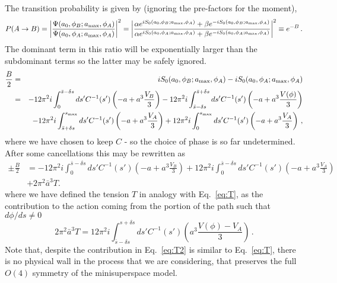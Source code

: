 \documentclass[a4paper,11pt]{article}
\numberwithin{equation}{section}
\begin{document}
The transition probability is given by (ignoring the pre-factors for
the moment),
\begin{equation}
P(A\rightarrow B)=\bigg|\frac{\Psi(a_{0},\phi_{B};a_{{\rm max}},\phi_{A})}{\Psi(a_{0},\phi_{A};a_{{\rm max}},\phi_{A})}\bigg|^{2}=\bigg|\frac{\alpha e^{iS_{0}(a_{0},\phi_{B};a_{{\rm max}},\phi_{A})}+\beta e^{-iS_{0}(a_{0},\phi_{B};a_{{\rm max}},\phi_{A})}}{\alpha e^{iS_{0}(a_{0},\phi_{A};a_{{\rm max}},\phi_{A})}+\beta e^{-iS_{0}(a_{0},\phi_{A};a_{{\rm max}},\phi_{A})}}\bigg|^{2}\equiv e^{-B}\label{eq:PAB} \,.
\end{equation}
The dominant term in this ratio will be exponentially larger than
the subdominant terms so the latter may be safely ignored.
\begin{eqnarray}
\frac{B}{2} & = & iS_{0}(a_{0},\phi_{B};a_{{\rm max}},\phi_{A})-iS_{0}(a_{0},\phi_{A};a_{{\rm max}},\phi_{A}) \label{eq:B1} \\
 & = & -12\pi^{2}i\int_{0}^{\bar{s}-\delta s}ds'C^{-1}(s')\left(-a+a^{3}\frac{V_{B}}{3}\right)-12\pi^{2}i\int_{\bar{s}-\delta s}^{\bar{s}+\delta s}ds'C^{-1}(s')\left(-a+a^{3}\frac{V(\phi)}{3}\right)\nonumber \\
 &  & -12\pi^{2}i\int_{\bar{s}+\delta s}^{s_{{\rm max}}}ds'C^{-1}(s')\left(-a+a^{3}\frac{V_{A}}{3}\right)+12\pi^{2}i\int_{0}^{s_{{\rm max}}}ds'C^{-1}(s')\left(-a+a^{3}\frac{V_{A}}{3}\right) \,, \nonumber
\end{eqnarray}
where we have chosen to keep $C$ - so the choice of phase is so far
undetermined. After some cancellations this may be rewritten as
\begin{align}
\pm \frac{B}{2} & =-12\pi{}^{2}i\int_{0}^{\bar{s}-\delta s}ds'C^{-1}(s')\left(-a+a^{3}\frac{V_{B}}{3}\right)+12\pi^{2}i\int_{0}^{\bar{s}-\delta s}ds'C^{-1}(s')\left(-a+a^{3}\frac{V_{A}}{3}\right)\nonumber \\
 & +2\pi^{2}\bar{a}^{3}T.\label{eq:B2}
\end{align}
where we have defined the tension $T$ in analogy with Eq.~\eqref{eq:T}, as the contribution to the action coming from the portion of the path such that $d\phi/ds \neq 0$
\begin{equation}
2\pi^{2}\bar{a}^{3}T=12\pi^{2}i\int_{\bar{s}-\delta s}^{s+\delta s}ds'C^{-1}(s')\left(a^{3}\frac{V(\phi)-V_{A}}{3}\right)\label{eq:T2}\,.
\end{equation}
Note that, despite the contribution in Eq.~\eqref{eq:T2} is similar to Eq.~\eqref{eq:T}, there is no physical wall in the process that we are considering, that preserves the full $O(4)$ symmetry of the minisuperspace model.
\end{document}
